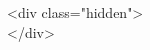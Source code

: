 <div class="hidden">
$$
\newcommand{\setmin}{\mathbin{\backslash}}
\newcommand{\symmdiff}{\mathbin{∆}}
$$
</div>
